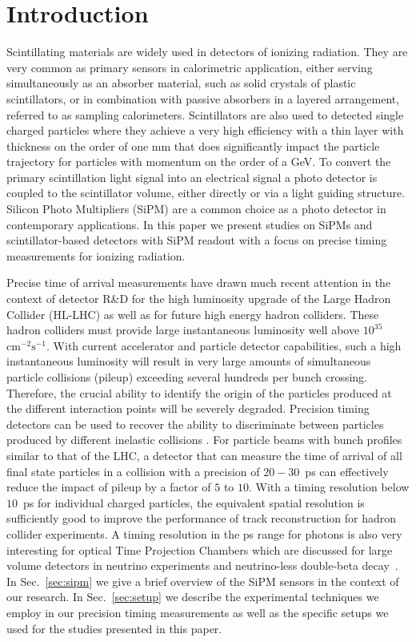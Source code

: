 \section{Introduction}
\label{sec:introduction}

Scintillating materials are widely used in detectors of ionizing radiation. They
are very common as primary sensors in calorimetric application, either serving
simultaneously as an absorber material, such as solid crystals of plastic
scintillators, or in combination with passive absorbers in a layered
arrangement, referred to as sampling calorimeters. Scintillators are also used
to detected single charged particles where they achieve a very high efficiency
with a thin layer with thickness on the order of one mm that does significantly
impact the particle trajectory for particles with momentum on the order of a GeV. To
convert the primary scintillation light signal into an electrical signal a photo
detector is coupled to the scintillator volume, either directly or via a light
guiding structure. Silicon Photo Multipliers (SiPM) are a common choice as a
photo detector in contemporary applications. In this paper we present studies on
SiPMs and scintillator-based detectors with SiPM readout with a focus on precise
timing measurements for ionizing radiation. 

Precise time of arrival measurements have drawn much recent attention in the 
context of detector R\&D for the high luminosity upgrade of the Large Hadron 
Collider (HL-LHC) as well as for future high energy hadron colliders.  
These hadron colliders must provide large 
instantaneous luminosity well above $10^{35}$~$\mathrm{cm}^{-2}\mathrm{s}^{-1}$.
With current accelerator and particle detector capabilities, such a high 
instantaneous luminosity will result in very large amounts
of simultaneous particle collisions (pileup) exceeding several hundreds per
bunch crossing. Therefore, the crucial ability to identify the origin 
of the particles produced at the different interaction points will be severely 
degraded. Precision timing detectors can be used to recover the ability to 
discriminate between particles produced by different inelastic collisions \cite{adielba}.
For particle beams with bunch profiles similar to that of the LHC, a detector 
that can measure the time of arrival of all final state particles in a collision
with a precision of $20-30$~ps can effectively reduce the impact of
pileup by a factor of $5$ to $10$. 
%
% 
% 
With a timing resolution below $10$~ps for individual charged particles, the
equivalent spatial resolution is sufficiently good to improve the performance of
track reconstruction \cite{Neri:2016bng} for hadron collider experiments. A timing
resolution in the ps range for photons is also very interesting for optical Time
Projection Chambers which are discussed for large volume detectors in neutrino
experiments and neutrino-less double-beta decay~\cite{Aberle:2013jba, otpc}. 
%
%
%
In Sec.~\ref{sec:sipm} we give a brief overview of the SiPM sensors in the
context of our research. In Sec.~\ref{sec:setup} we describe the experimental
techniques we employ in our precision timing measurements as well as the
specific setups we used for the studies presented in this paper. 

